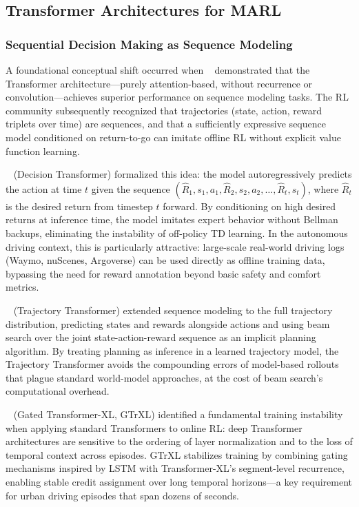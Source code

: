 \documentclass[12pt, a4paper]{article}
\begin{document}
\subsection{Transformer Architectures for MARL}

\subsubsection{Sequential Decision Making as Sequence Modeling}

A foundational conceptual shift occurred when
\citeauthor{vaswani2017attention}~\cite{vaswani2017attention} demonstrated
that the Transformer architecture---purely attention-based, without recurrence
or convolution---achieves superior performance on sequence modeling tasks.
The RL community subsequently recognized that trajectories (state, action,
reward triplets over time) are sequences, and that a sufficiently expressive
sequence model conditioned on return-to-go can imitate offline RL without
explicit value function learning.

\citeauthor{chen2021decision}~\cite{chen2021decision} (Decision Transformer)
formalized this idea: the model autoregressively predicts the action at time
$t$ given the sequence
$(\hat{R}_1, s_1, a_1, \hat{R}_2, s_2, a_2, \ldots, \hat{R}_t, s_t)$,
where $\hat{R}_t$ is the desired return from timestep $t$ forward.  By
conditioning on high desired returns at inference time, the model imitates
expert behavior without Bellman backups, eliminating the instability of
off-policy TD learning.  In the autonomous driving context, this is
particularly attractive: large-scale real-world driving logs (Waymo, nuScenes,
Argoverse) can be used directly as offline training data, bypassing the need
for reward annotation beyond basic safety and comfort metrics.

\citeauthor{janner2021offline}~\cite{janner2021offline} (Trajectory Transformer)
extended sequence modeling to the full trajectory distribution, predicting
states and rewards alongside actions and using beam search over the joint
state-action-reward sequence as an implicit planning algorithm.  By treating
planning as inference in a learned trajectory model, the Trajectory Transformer
avoids the compounding errors of model-based rollouts that plague standard
world-model approaches, at the cost of beam search's computational overhead.

\citeauthor{parisotto2020stabilizing}~\cite{parisotto2020stabilizing}
(Gated Transformer-XL, GTrXL) identified a fundamental training instability
when applying standard Transformers to online RL: deep Transformer architectures
are sensitive to the ordering of layer normalization and to the loss of temporal
context across episodes.  GTrXL stabilizes training by combining gating
mechanisms inspired by LSTM with Transformer-XL's segment-level recurrence,
enabling stable credit assignment over long temporal horizons---a key
requirement for urban driving episodes that span dozens of seconds.
\end{document}
